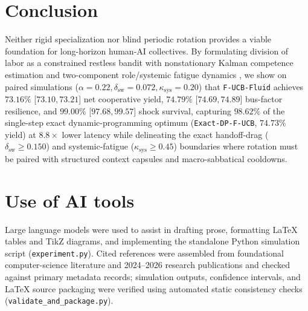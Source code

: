 \documentclass[11pt]{article}
\begin{document}
\section{Conclusion}\label{sec:conclusion}

Neither rigid specialization nor blind periodic rotation provides a viable foundation for long-horizon human-AI collectives. By formulating division of labor as a constrained restless bandit with nonstationary Kalman competence estimation and two-component role/systemic fatigue dynamics \citep{whittle1988restless, jaber1996learning}, we show on paired simulations ($\alpha=0.22,\allowbreak \delta_{\mathrm{sw}} = 0.072,\allowbreak \kappa_{\mathrm{sys}} = 0.20$) that \texttt{F-UCB-Fluid} achieves $73.16\%$ [$73.10, 73.21$] net cooperative yield, $74.79\%$ [$74.69, 74.89$] bus-factor resilience, and $99.00\%$ [$97.68, 99.57$] shock survival, capturing $98.62\%$ of the single-step exact dynamic-programming optimum (\texttt{Exact-DP-F-UCB}, $74.73\%$ yield) at $8.8\times$ lower latency while delineating the exact handoff-drag ($\delta_{\mathrm{sw}} \ge 0.150$) and systemic-fatigue ($\kappa_{\mathrm{sys}} \ge 0.45$) boundaries where rotation must be paired with structured context capsules and macro-sabbatical cooldowns.

\section*{Use of AI tools}
Large language models were used to assist in drafting prose, formatting \LaTeX{} tables and TikZ diagrams, and implementing the standalone Python simulation script (\texttt{experiment.\linebreak[0]py}). Cited references were assembled from foundational computer-science literature and 2024--2026 research publications and checked against primary metadata records; simulation outputs, confidence intervals, and \LaTeX{} source packaging were verified using automated static consistency checks (\texttt{validate\_\linebreak[0]and\_\linebreak[0]package.\linebreak[0]py}).



\end{document}
